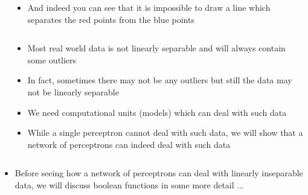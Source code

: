 \begin{frame}
\begin{columns}
\begin{overlayarea}{\textwidth}{\textheight}
\begin{itemize}
			\end{itemize}
		\end{overlayarea}
		\begin{overlayarea}{\textwidth}{\textheight}
			\onslide<7->{
				
			}
			\begin{itemize}\justifying
				\item<8-> And indeed you can see that it is impossible to draw a line which separates the red points from the blue points
			\end{itemize}
		\end{overlayarea}
	\end{columns}
\end{frame}

\begin{frame}
	\begin{columns}
		\begin{overlayarea}{\textwidth}{\textheight}
			
		\end{overlayarea}
		\begin{overlayarea}{\textwidth}{\textheight}
			\begin{itemize}\justifying
				\item<1-> Most real world data is not linearly separable and will always contain some outliers
				\item<2-> In fact, sometimes there may not be any outliers but still the data may not be linearly separable
				\item<3-> We need computational units (models) which can deal with such data
				\item<4-> While a single perceptron cannot deal with such data, we will show that a network of perceptrons can indeed deal with such data
			\end{itemize}
		\end{overlayarea}
	\end{columns}
\end{frame}


\begin{frame}
	\begin{itemize}\justifying
		\item<1-> Before seeing how a network of perceptrons can deal with linearly inseparable data, we will discuss boolean functions in some more detail ...
	\end{itemize}
\end{frame}


